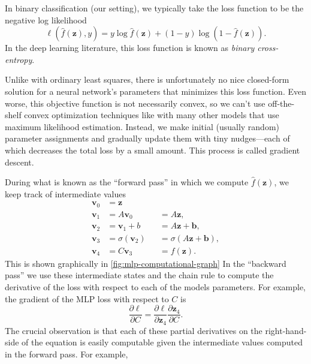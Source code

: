 
In binary classification (our setting), we typically take the loss function to be the negative log likelihood
\begin{equation}
	\label{eqn:bce-loss}
	\ell(\hat f(\mathbf z), y) = y \log \hat f(\mathbf z) + (1 - y) \log (1 - \hat f(\mathbf z)).
\end{equation}
In the deep learning literature, this loss function is known as \emph{binary cross-entropy}.

Unlike with ordinary least squares, there is unfortunately no nice closed-form solution for a neural network's parameters that minimizes this loss function. Even worse, this objective function is not necessarily convex, so we can't use off-the-shelf convex optimization techniques like with many other models that use maximum likelihood estimation.
Instead, we make initial (usually random) parameter assignments and gradually update them with tiny nudges---each of which decreases the total loss by a small amount. This process is called gradient descent.


During what is known as the ``forward pass'' in which we compute $\hat f(\mathbf z)$, we keep track of intermediate values
\begin{equation}
	\begin{aligned}
		\mathbf v_0 & = \mathbf z                                                   \\
		\mathbf v_1 & = A\mathbf v_0        &  & = A \mathbf z,                     \\
		\mathbf v_2 & = \mathbf v_1 + b     &  & = A\mathbf z  + \mathbf b,         \\
		\mathbf v_3 & = \sigma(\mathbf v_2) &  & = \sigma(A\mathbf z  + \mathbf b), \\
		\mathbf v_4 & = C \mathbf v_3       &  & = f(\mathbf z).
	\end{aligned}
\end{equation}
This is shown graphically in \autoref{fig:mlp-computational-graph}
In the ``backward pass'' we use these intermediate states and the chain rule to compute the derivative of the loss with respect to each of the models parameters.
For example, the gradient of the MLP loss with respect to $C$ is
\begin{equation*}
	\frac{\partial \ell}{\partial C}
	= \frac{\partial \ell}{\partial \mathbf z_4}
	\frac{\partial \mathbf z_4}{\partial C}.
\end{equation*}
The crucial observation is that each of these partial derivatives on the right-hand-side of the equation is easily computable given the intermediate values computed in the forward pass.
For example,


